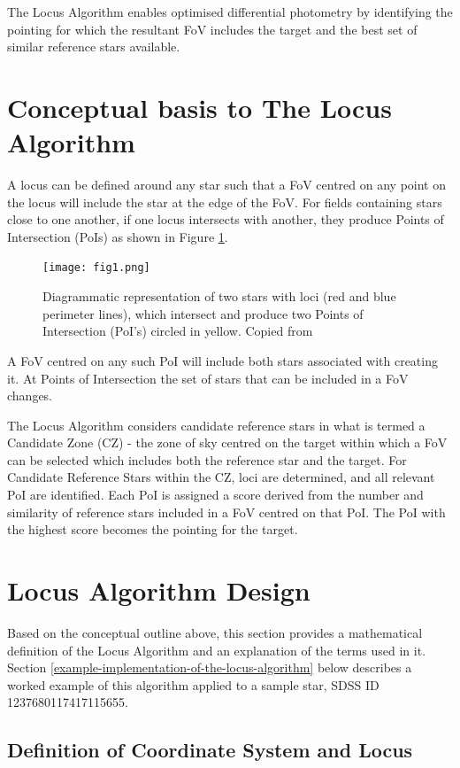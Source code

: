 \documentclass[]{elsarticle} %
\begin{document}
The Locus Algorithm enables optimised differential photometry by
identifying the pointing for which the resultant FoV includes the target
and the best set of similar reference stars available.

\hypertarget{conceptual-basis-to-the-locus-algorithm}{%
\section{Conceptual basis to The Locus
Algorithm}\label{conceptual-basis-to-the-locus-algorithm}}

A locus can be defined around any star such that a FoV centred on any
point on the locus will include the star at the edge of the FoV. For
fields containing stars close to one another, if one locus intersects
with another, they produce Points of Intersection (PoIs) as shown in Figure \ref{loci_concept}.

\begin{figure}
\centering
\texttt{[image: fig1.png]}
\caption{\label{loci_concept}Diagrammatic representation of two stars with loci
(red and blue perimeter lines), which intersect and produce two Points
of Intersection (PoI's) circled in yellow.  Copied from \citet{creaner2016thesis}}
\end{figure}

A FoV centred on any such PoI will include both stars associated with
creating it. At Points of Intersection the set of stars that can be
included in a FoV changes.

The Locus Algorithm considers candidate reference stars in what is
termed a Candidate Zone (CZ) - the zone of sky centred on the target
within which a FoV can be selected which includes both the reference
star and the target. For Candidate Reference Stars within the CZ, 
loci are determined, and all relevant PoI are identified. Each PoI 
is assigned a score derived from the number and similarity of reference
stars included in a FoV centred on that PoI. The PoI with the highest score 
becomes the pointing for the target.

\hypertarget{locus-algorithm-design}{%
\section{Locus Algorithm Design}\label{locus-algorithm-design}}
Based on the conceptual outline above, this section provides a mathematical
definition of the Locus Algorithm and an explanation of the terms used in it.
Section \ref{example-implementation-of-the-locus-algorithm} below describes a
 worked example of this algorithm applied to a sample star, SDSS ID 1237680117417115655.
\hypertarget{definition-of-coordinate-system-and-locus}{%
\subsection{Definition of Coordinate System and
Locus}\label{definition-of-coordinate-system-and-locus}}
\end{document}
